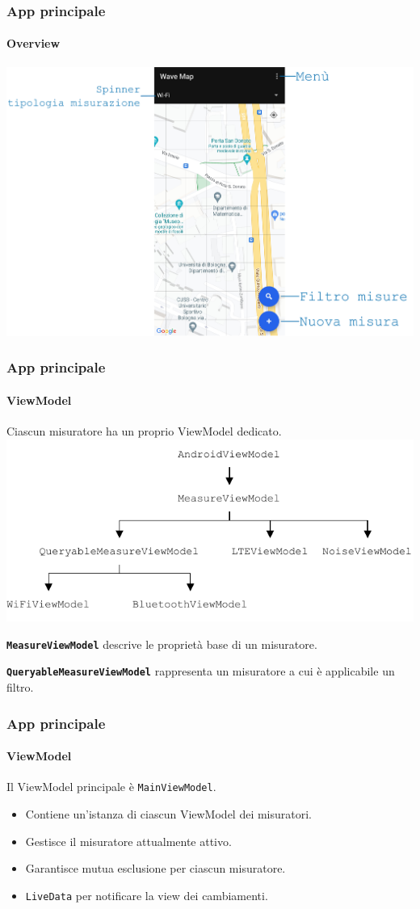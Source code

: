\documentclass{beamer}
\begin{document}
\begin{frame}
    \frametitle{App principale}
    \framesubtitle{Overview}

    \centering
    \includegraphics[width=\linewidth]{./img/overview/main.pdf}
\end{frame}


\begin{frame}
    \frametitle{App principale}
    \framesubtitle{ViewModel}

    Ciascun misuratore ha un proprio ViewModel dedicato.
    \includegraphics[width=\linewidth]{./img/viewmodel.pdf}

    \textbf{\texttt{MeasureViewModel}} descrive le proprietà base di un misuratore.

    \textbf{\texttt{QueryableMeasureViewModel}} rappresenta un misuratore a cui è applicabile un filtro.
\end{frame}


\begin{frame}
    \frametitle{App principale}
    \framesubtitle{ViewModel}

    Il ViewModel principale è \texttt{MainViewModel}.
    \begin{itemize}
        \item Contiene un'istanza di ciascun ViewModel dei misuratori.
        \item Gestisce il misuratore attualmente attivo.
        \item Garantisce mutua esclusione per ciascun misuratore.
        \item \texttt{LiveData} per notificare la view dei cambiamenti.
    \end{itemize}
    

\end{frame}
\end{document}
